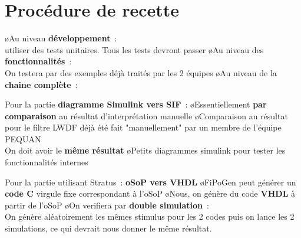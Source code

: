 \section{Procédure de recette}

\begin{frame} 
    \BI
	\o Au niveau \textbf{développement}~:\\
	 utiliser des tests unitaires.
	Tous les tests devront passer
	\smallskip
	\o Au niveau des \textbf{fonctionnalités}~:\\ On testera par des exemples déjà traités par les 2 équipes
	\smallskip
	\o Au niveau de la \textbf{chaine complète}~:\\
	\smallskip
	\begin{center}
	\end{center} 
    \EI
\end{frame} 
\begin{frame} 
Pour la partie \textbf{diagramme Simulink vers SIF}~:
	\smallskip
	\BI
	\o Essentiellement \textbf{par comparaison} au résultat d'interprétation manuelle
	\o Comparaison au résultat pour le filtre LWDF déjà été fait "manuellement" par un membre de l'équipe PEQUAN\\
		On doit avoir le \textbf{même résultat}
	\o Petits diagrammes simulink  pour tester les fonctionnalités internes
	\EI
{}
\end{frame}
\begin{frame} 
Pour la partie utilisant Stratus~: \textbf{oSoP vers VHDL}
	\smallskip
	\BI
	\o FiPoGen peut générer un \textbf{code C} virgule fixe correspondant à l'oSoP
	\o Nous, on génère du code \textbf{VHDL} à partir de l'oSoP
	\o On verifiera par \textbf{double simulation}~:\\
		On génère aléatoirement les mêmes stimulus pour les 2 codes puis on lance les 2 simulations, ce qui devrait nous donner le même résultat.
	\EI
\end{frame} 

